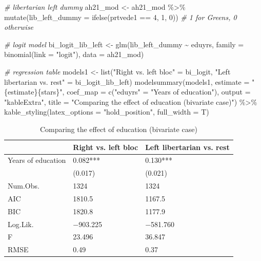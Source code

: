 \documentclass[
]{article}
\newenvironment{Shaded}{\begin{snugshade}}{\end{snugshade}}
\newcommand{\AttributeTok}[1]{\textcolor[rgb]{0.77,0.63,0.00}{#1}}
\newcommand{\CommentTok}[1]{\textcolor[rgb]{0.56,0.35,0.01}{\textit{#1}}}
\newcommand{\DecValTok}[1]{\textcolor[rgb]{0.00,0.00,0.81}{#1}}
\newcommand{\FunctionTok}[1]{\textcolor[rgb]{0.00,0.00,0.00}{#1}}
\newcommand{\NormalTok}[1]{#1}
\newcommand{\OtherTok}[1]{\textcolor[rgb]{0.56,0.35,0.01}{#1}}
\newcommand{\SpecialCharTok}[1]{\textcolor[rgb]{0.00,0.00,0.00}{#1}}
\newcommand{\StringTok}[1]{\textcolor[rgb]{0.31,0.60,0.02}{#1}}
\begin{document}
\begin{Shaded}
\begin{Highlighting}[]
\CommentTok{\# libertarian left dummy }
\NormalTok{ah21\_mod }\OtherTok{\textless{}{-}}\NormalTok{ ah21\_mod }\SpecialCharTok{\%\textgreater{}\%}
  \FunctionTok{mutate}\NormalTok{(}\AttributeTok{lib\_left\_dummy =} \FunctionTok{ifelse}\NormalTok{(prtvede1 }\SpecialCharTok{==} \DecValTok{4}\NormalTok{, }\DecValTok{1}\NormalTok{, }\DecValTok{0}\NormalTok{)) }\CommentTok{\# 1 for Greens, 0 otherwise}

\CommentTok{\# logit model }
\NormalTok{bi\_logit\_lib\_left }\OtherTok{\textless{}{-}} \FunctionTok{glm}\NormalTok{(lib\_left\_dummy }\SpecialCharTok{\textasciitilde{}}\NormalTok{ eduyrs, }
                         \AttributeTok{family =} \FunctionTok{binomial}\NormalTok{(}\AttributeTok{link =} \StringTok{"logit"}\NormalTok{), }
                         \AttributeTok{data =}\NormalTok{ ah21\_mod)}

\CommentTok{\# regression table }
\NormalTok{models1 }\OtherTok{\textless{}{-}} \FunctionTok{list}\NormalTok{(}\StringTok{"Right vs. left bloc"} \OtherTok{=}\NormalTok{ bi\_logit, }
                \StringTok{"Left libertarian vs. rest"} \OtherTok{=}\NormalTok{ bi\_logit\_lib\_left)}
\FunctionTok{modelsummary}\NormalTok{(models1, }
             \AttributeTok{estimate =} \StringTok{"\{estimate\}\{stars\}"}\NormalTok{, }
             \AttributeTok{coef\_map =} \FunctionTok{c}\NormalTok{(}\StringTok{"eduyrs"} \OtherTok{=} \StringTok{"Years of education"}\NormalTok{), }
             \AttributeTok{output =} \StringTok{"kableExtra"}\NormalTok{, }
             \AttributeTok{title =} \StringTok{"Comparing the effect of education (bivariate case)"}\NormalTok{) }\SpecialCharTok{\%\textgreater{}\%}
  \FunctionTok{kable\_styling}\NormalTok{(}\AttributeTok{latex\_options =} \StringTok{"hold\_position"}\NormalTok{, }\AttributeTok{full\_width =}\NormalTok{ T)}
\end{Highlighting}
\end{Shaded}

\begin{table}[!h]

\caption{\label{tab:lib-left-logit-comp}Comparing the effect of education (bivariate case)}
\centering
\begin{tabu} to 
\toprule
  & Right vs. left bloc & Left libertarian vs. rest\\
\midrule
Years of education & \num{0.082}*** & \num{0.130}***\\
 & (\num{0.017}) & (\num{0.021})\\
\midrule
Num.Obs. & \num{1324} & \num{1324}\\
AIC & \num{1810.5} & \num{1167.5}\\
BIC & \num{1820.8} & \num{1177.9}\\
Log.Lik. & \num{-903.225} & \num{-581.760}\\
F & \num{23.496} & \num{36.847}\\
RMSE & \num{0.49} & \num{0.37}\\
\bottomrule
\end{tabu}
\end{table}
\end{document}
